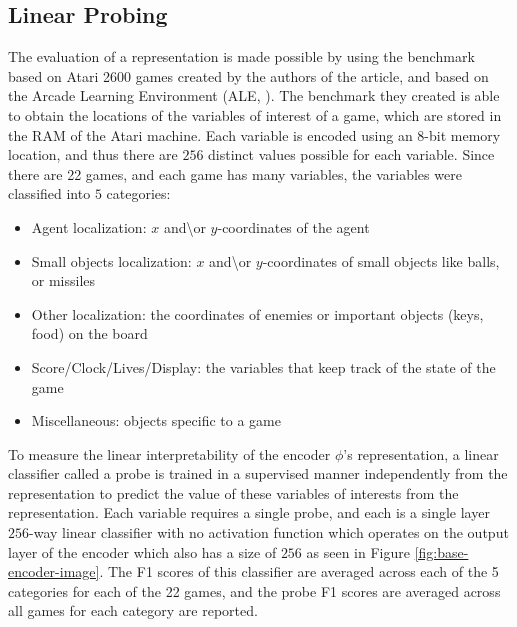 \subsection{Linear Probing}
The evaluation of a representation is made possible by using the benchmark based on Atari 2600 games created by the authors of the article, and based on the Arcade Learning Environment (ALE, \cite{ALE}). The benchmark they created is able to obtain the locations of the variables of interest of a game, which are stored in the RAM of the Atari machine. Each variable is encoded using an $8$-bit memory location, and thus there are $256$ distinct values possible for each variable. Since there are 22 games, and each game has many variables, the variables were classified into $5$ categories: 
\begin{itemize}
    \item Agent localization: $x$ and\textbackslash or $y$-coordinates of the agent
    \item Small objects localization: $x$ and\textbackslash or $y$-coordinates of small objects like balls, or missiles
    \item Other localization: the coordinates of enemies or important objects  (keys, food) on the board
    \item Score/Clock/Lives/Display: the variables that keep track of the state of the game
    \item Miscellaneous: objects specific to a game
\end{itemize}

To measure the linear interpretability of the encoder $\phi$'s representation, a linear classifier called a probe is trained in a supervised manner independently from the representation to predict the value of these variables of interests from the representation. Each variable requires a single probe, and each is a single layer $256$-way linear classifier with no activation function which operates on the output layer of the encoder which also has a size of $256$ as seen in Figure \ref{fig:base-encoder-image}. The F1 scores of this classifier are averaged across each of the 5 categories for each of the 22 games, and the probe F1 scores are averaged across all games for each category are reported.

